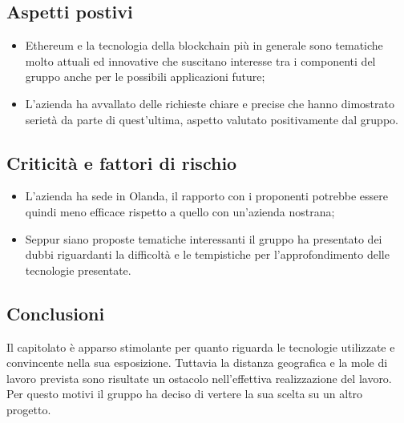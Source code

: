     \subsection{Aspetti postivi}
    \begin{itemize}
        \item Ethereum e la tecnologia della blockchain più in generale sono tematiche molto attuali ed innovative che suscitano interesse tra i componenti del gruppo
        anche per le possibili applicazioni future;
        \item L'azienda ha avvallato delle richieste chiare e precise che hanno dimostrato serietà da parte di quest'ultima, aspetto valutato positivamente dal gruppo.
    \end{itemize}
    \subsection{Criticità e fattori di rischio}
    \begin{itemize}
        \item L'azienda ha sede in Olanda, il rapporto con i proponenti potrebbe essere quindi meno efficace rispetto a quello con un'azienda nostrana;
        \item Seppur siano proposte tematiche interessanti il gruppo ha presentato dei dubbi riguardanti la difficoltà e le tempistiche per l'approfondimento
        delle tecnologie presentate.
    \end{itemize}
    \subsection{Conclusioni}
    Il capitolato è apparso stimolante per quanto riguarda le tecnologie utilizzate e convincente nella sua esposizione. Tuttavia la distanza geografica e la
    mole di lavoro prevista sono risultate un ostacolo nell'effettiva realizzazione del lavoro. Per questo motivi il gruppo ha deciso di vertere la sua scelta
    su un altro progetto.
